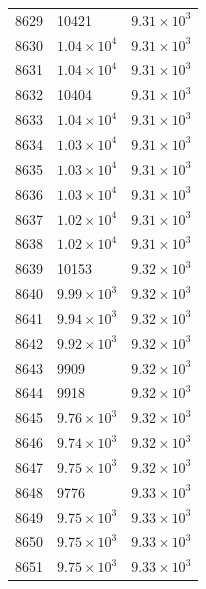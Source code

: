 \begin{table}[H]
\begin{tabular}{lll}
8629 & 10421 & $\displaystyle 9.31 \times 10^{3}$ \\
8630 & $\displaystyle 1.04 \times 10^{4}$ & $\displaystyle 9.31 \times 10^{3}$ \\
8631 & $\displaystyle 1.04 \times 10^{4}$ & $\displaystyle 9.31 \times 10^{3}$ \\
8632 & 10404 & $\displaystyle 9.31 \times 10^{3}$ \\
8633 & $\displaystyle 1.04 \times 10^{4}$ & $\displaystyle 9.31 \times 10^{3}$ \\
8634 & $\displaystyle 1.03 \times 10^{4}$ & $\displaystyle 9.31 \times 10^{3}$ \\
8635 & $\displaystyle 1.03 \times 10^{4}$ & $\displaystyle 9.31 \times 10^{3}$ \\
8636 & $\displaystyle 1.03 \times 10^{4}$ & $\displaystyle 9.31 \times 10^{3}$ \\
8637 & $\displaystyle 1.02 \times 10^{4}$ & $\displaystyle 9.31 \times 10^{3}$ \\
8638 & $\displaystyle 1.02 \times 10^{4}$ & $\displaystyle 9.31 \times 10^{3}$ \\
8639 & 10153 & $\displaystyle 9.32 \times 10^{3}$ \\
8640 & $\displaystyle 9.99 \times 10^{3}$ & $\displaystyle 9.32 \times 10^{3}$ \\
8641 & $\displaystyle 9.94 \times 10^{3}$ & $\displaystyle 9.32 \times 10^{3}$ \\
8642 & $\displaystyle 9.92 \times 10^{3}$ & $\displaystyle 9.32 \times 10^{3}$ \\
8643 & 9909 & $\displaystyle 9.32 \times 10^{3}$ \\
8644 & 9918 & $\displaystyle 9.32 \times 10^{3}$ \\
8645 & $\displaystyle 9.76 \times 10^{3}$ & $\displaystyle 9.32 \times 10^{3}$ \\
8646 & $\displaystyle 9.74 \times 10^{3}$ & $\displaystyle 9.32 \times 10^{3}$ \\
8647 & $\displaystyle 9.75 \times 10^{3}$ & $\displaystyle 9.32 \times 10^{3}$ \\
8648 & 9776 & $\displaystyle 9.33 \times 10^{3}$ \\
8649 & $\displaystyle 9.75 \times 10^{3}$ & $\displaystyle 9.33 \times 10^{3}$ \\
8650 & $\displaystyle 9.75 \times 10^{3}$ & $\displaystyle 9.33 \times 10^{3}$ \\
8651 & $\displaystyle 9.75 \times 10^{3}$ & $\displaystyle 9.33 \times 10^{3}$ \\

\end{tabular}
\end{table}
